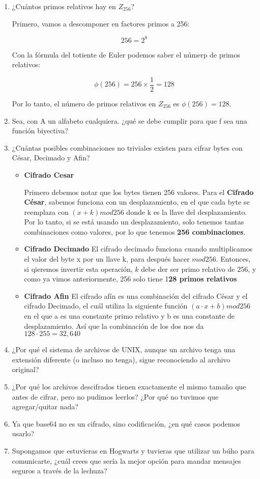 \begin{enumerate}
\item ¿Cuántos primos relativos hay en $Z_{256}$?


Primero, vamos a descomponer en factores primos a 256:

  $$ 256 = 2^8$$
  

Con la fórmula del totiente de Euler podemos saber el númerp de primos relativos:

 $$\phi(256) = 256 \times \frac{1}{2} = 128$$


Por lo tanto, el número de primos relativos en $ Z_{256} $ es $ \phi(256) = 128 $.

\item Sea, con A un alfabeto cualquiera. ¿qué se debe
cumplir para que f sea una función biyectiva?
\item ¿Cuántas posibles combinaciones no triviales existen para cifrar bytes con César, Decimado
y Afin?
\begin{itemize}
\item \textbf{Cifrado Cesar}

Primero debemos notar que los bytes tienen 256 valores.
Para el \textbf{Cifrado César},  sabemos funciona con un desplazamiento, en el que cada byte se reemplaza con $(x + k) mod 256$ donde k es la llave del desplazamiento. Por lo tanto, si se está usando un desplazamiento, solo tenemos tantas combinaciones como valores, por lo que tenemos \textbf{256 combinaciones}.

\item \textbf{Cifrado Decimado}
El cifrado decimado funciona cuando multiplicamos el valor del byte x por un llave k, para después hacer $mod 256$. Entonces, si qieremos invertir esta operación, $k$ debe der ser primo relativo  de 256, y como ya vimos anteriormente, 256 solo tiene 1\textbf{28 primos relativos} 

\item \textbf{Cifrado Afin}
El cifrado afín es una combinación del cifrado César y el cifrado Decimado, el cuál utiliza la siguiente función $(a\cdot x + b) mod 256$ en el que a es una constante primo relativo y b es una constante de desplazamiento.
Así que la combinación de los dos nos da $128 \cdot 255 = 32, 640$
\end{itemize}
\item ¿Por qué el sistema de archivos de UNIX, aunque un archivo tenga una extensión diferente
(o incluso no tenga), sigue reconociendo al archivo original?
\item ¿Por qué los archivos descifrados tienen exactamente el mismo tamaño que antes de cifrar,
pero no pudimos leerlos? ¿Por qué no tuvimos que agregar/quitar nada?
\item Ya que base64 no es un cifrado, sino codificación, ¿en qué casos podemos usarlo?
\item Supongamos que estuvieras en Hogwarts y tuvieras que utilizar un búho para comunicarte,
¿cuál crees que sería la mejor opción para mandar mensajes seguros a través de la lechuza?
\end{enumerate}